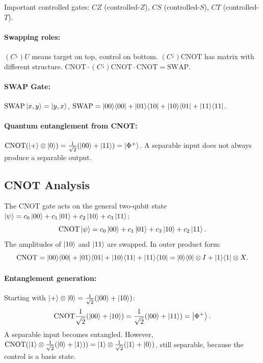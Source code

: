 \documentclass[10pt,a4paper]{article}
\begin{document}
Important controlled gates: $CZ$ (controlled-$Z$), $CS$ (controlled-$S$), $CT$ (controlled-$T$).

\paragraph{Swapping roles:} $(C^\downarrow)U$ means target on top, control on bottom. $(C^\downarrow)\mathrm{CNOT}$ has matrix with different structure. $\mathrm{CNOT}\cdot(C^\downarrow)\mathrm{CNOT}\cdot\mathrm{CNOT}=\mathrm{SWAP}$.

\paragraph{SWAP Gate:} $\mathrm{SWAP}\ket{x,y}=\ket{y,x}$, $\mathrm{SWAP}=\ket{00}\!\bra{00}+\ket{01}\!\bra{10}+\ket{10}\!\bra{01}+\ket{11}\!\bra{11}$.

\paragraph{Quantum entanglement from CNOT:} $\mathrm{CNOT}(\ket{+}\otimes\ket{0})=\frac{1}{\sqrt{2}}(\ket{00}+\ket{11})=\ket{\Phi^+}$. A separable input does not always produce a separable output.

\subsection{CNOT Analysis}

The CNOT gate acts on the general two-qubit state $\ket{\psi}=c_0\ket{00}+c_1\ket{01}+c_2\ket{10}+c_3\ket{11}$:
\[
\mathrm{CNOT}\ket{\psi} = c_0\ket{00}+c_1\ket{01}+c_3\ket{10}+c_2\ket{11}.
\]
The amplitudes of $\ket{10}$ and $\ket{11}$ are swapped. In outer product form:
\[
\mathrm{CNOT} = \ket{00}\!\bra{00}+\ket{01}\!\bra{01}+\ket{10}\!\bra{11}+\ket{11}\!\bra{10} = \ket{0}\!\bra{0}\otimes I + \ket{1}\!\bra{1}\otimes X.
\]

\paragraph{Entanglement generation:} Starting with $\ket{+}\otimes\ket{0}=\frac{1}{\sqrt{2}}(\ket{00}+\ket{10})$:
\[
\mathrm{CNOT}\frac{1}{\sqrt{2}}(\ket{00}+\ket{10}) = \frac{1}{\sqrt{2}}(\ket{00}+\ket{11}) = \ket{\Phi^+}.
\]
A separable input becomes entangled. However, $\mathrm{CNOT}(\ket{1}\otimes\frac{1}{\sqrt{2}}(\ket{0}+\ket{1}))=\ket{1}\otimes\frac{1}{\sqrt{2}}(\ket{1}+\ket{0})$, still separable, because the control is a basis state.
\end{document}
